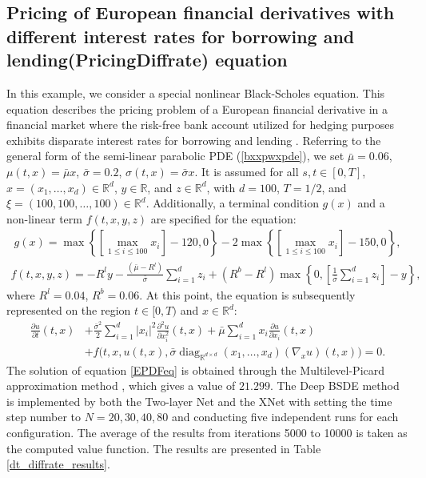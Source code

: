 \documentclass[11pt]{article}
\begin{document}
\subsection{Pricing of European financial derivatives with different interest rates for borrowing and lending(PricingDiffrate) equation}
In this example, we consider a special nonlinear Black-Scholes equation. This equation describes the pricing problem of a European financial derivative in a financial market where the risk-free bank account utilized for hedging purposes exhibits disparate interest rates for borrowing and lending \textsuperscript{\cite{Bergman4}}. Referring to the general form of the semi-linear parabolic PDE (\ref{bxxpwxpde}), we set $\bar{\mu}=0.06$, $\mu(t,x)=\bar{\mu}x$, $\bar{\sigma}=0.2$, $\sigma(t,x)=\bar{\sigma}x$. It is assumed for all $s,t\in[0,T]$, $x=(x_1,\ldots,x_d)\in\mathbb{R}^d$, $y\in\mathbb{R}$, and $z\in\mathbb{R}^{d}$, with $d=100$, $T=1/2$, and $\xi=(100,100,\ldots,100)\in\mathbb{R}^d$. Additionally, a terminal condition $g(x)$ and a non-linear term $f(t,x,y,z)$ are specified for the equation:
\begin{equation}\label{EPDFeqg}
	\begin{array}{l}
		g(x) = \max \left\{ {\left[ {{{\max }_{1 \le i \le 100}}{x_i}} \right] - 120,0} \right\} - 2\max \left\{ {\left[ {{{\max }_{1 \le i \le 100}}{x_i}} \right] - 150,0} \right\},
	\end{array}
\end{equation}
\begin{equation}\label{EPDFeqf}
	\begin{array}{l}
		f(t,x,y,z) =  - {R^l}y - \frac{{\left( {\bar \mu  - {R^l}} \right)}}{{\bar \sigma }}\sum\limits_{i = 1}^d {{z_i}}  + \left( {{R^b} - {R^l}} \right)\max \left\{ {0,\left[ {\frac{1}{{\bar \sigma }}\sum\limits_{i = 1}^d {{z_i}} } \right] - y} \right\},
	\end{array}
\end{equation}
where $R^l=0.04$, $R^b=0.06$. At this point, the equation is subsequently represented on the region $t \in [0, T)$ and $x \in \mathbb{R}^d$:
\begin{equation}\label{EPDFeq}
	\begin{aligned}
		\frac{\partial u}{\partial t}(t,x)
		&+\frac{\bar{\sigma}^{2}}{2}\sum_{i=1}^{d}|x_{i}|^{2} \frac{\partial^{2}u}{\partial x_{i}^{2}}(t,x) +\bar{\mu}\sum_{i=1}^{d}x_{i} \frac{\partial u}{\partial x_{i}}(t,x)\\
		&+f\big(t,x,u(t,x),\bar{\sigma}\operatorname{diag}_{\mathbb{R}^{d\times d}}(x_{1},\ldots,x_{d})(\nabla_{x}u)(t,x)\big)=0.
	\end{aligned}
\end{equation}
The solution of equation \eqref{EPDFeq} is obtained through the Multilevel-Picard approximation method \cite{multilevel-Picard}, which gives a value of $21.299$. 
The Deep BSDE method is implemented by both the Two-layer Net and the XNet with setting the time step number to $N=20, 30, 40, 80$ and conducting five independent runs for each configuration. The average of the results from iterations 5000 to 10000 is taken as the computed value function. The results are presented in Table \ref{dt_diffrate_results}.
\end{document}

